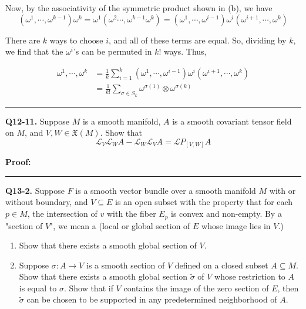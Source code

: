 \documentclass{article}
\begin{document}
\begin{enumerate}[label=(\alph*)]
Now, by the associativity of the symmetric product shown in (b), we have 
\[ (\omega^1, \cdots, \omega^{k-1}) \omega^k = \omega^1 (\omega^2 \cdots, \omega^{k-1} \omega^k) = \left(\omega^1, \cdots, \omega^{i-1}\right) \omega^i \left(\omega^{i+1}, \cdots, \omega^{k}\right)  \]

There are $k$ ways to choose $i$, and all of these terms are equal. So, dividing by $k$, we find that the $\omega^i$'s can be permuted in $k!$ ways. Thus, 

\begin{align*}
  \omega^1, \cdots, \omega^k &= \frac{1}{k} \sum_{i = 1}^{k} \left(\omega^1, \cdots, \omega^{i-1}\right) \omega^i \left(\omega^{i+1}, \cdots, \omega^{k}\right) \\
  &= \frac{1}{k!} \sum_{\sigma \in S_k} \omega^{\sigma(1)} \otimes \omega^{\sigma(k)}
\end{align*}
 
\end{enumerate}


\vskip 0.5cm
\hrule 
\vskip 0.5cm



\textbf{Q12-11.} Suppose $M$ is a smooth manifold, $A$ is a smooth covariant tensor field on $M$, and $V, W \in \mathfrak{X}(M)$. Show that 
\[ \mathcal{L}_V \mathcal{L}_W A - \mathcal{L}_W \mathcal{L}_V A = \mathcal{L}P_{[V, W]} A \]

\vskip 0.5cm
\textbf{Proof:}


\vskip 0.5cm
\hrule 
\vskip 0.5cm




\textbf{Q13-2.} 
Suppose $F$ is a smooth vector bundle over a smooth manifold $M$ with or without boundary, and $V \subseteq E$ is an open subset with the property that for each $p \in M$, the intersection of $v$ with the fiber $E_p$ is convex and non-empty. By a "section of $V$", we mean a (local or global section of $E$ whose image lies in $V$.)
\begin{enumerate}[label=(\alph*)]
  \item Show that there exists a smooth global section of $V$.
  \item Suppose $\sigma : A \rightarrow V$ is a smooth section of $V$ defined on a closed subset $A \subseteq M$. Show that there exists a smooth global section $\tilde{\sigma}$ of $V$ whose restriction to $A$ is equal to $\sigma$. Show that if $V$ contains the image of the zero section of $E$, then $\tilde{\sigma}$ can be chosen to be supported in any predetermined neighborhood of $A$.
\end{enumerate}
\end{document}
